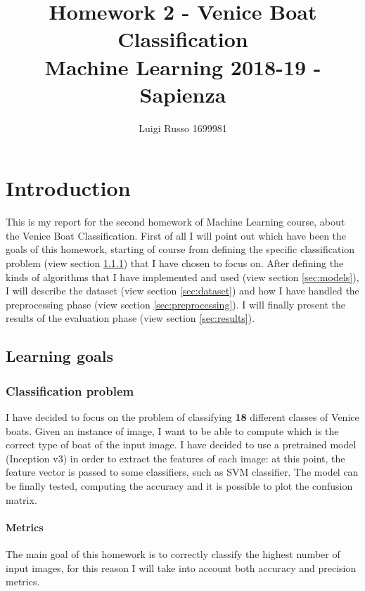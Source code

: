 \documentclass[12pt]{article}
\title{Homework 2 - Venice Boat Classification\\
	\large Machine Learning 2018-19 - Sapienza}
\author{Luigi Russo 1699981}
\begin{document}
	
\maketitle
\newpage
\tableofcontents
\newpage
\section{Introduction}
This is my report for the second homework of Machine Learning course, about the Venice Boat Classification. First of all I will point out which have been the goals of this homework, starting of course from defining the specific classification problem (view section \ref{sec:image_classification_problem}) that I have chosen to focus on. After defining the kinds of algorithms that I have implemented and used (view section \ref{sec:models}), I will describe the dataset (view section \ref{sec:dataset}) and how I have handled the preprocessing phase (view section \ref{sec:preprocessing}). I will finally present the results of the evaluation phase (view section \ref{sec:results}).

\subsection{Learning goals}
\subsubsection{Classification problem}
\label{sec:image_classification_problem}
I have decided to focus on the problem of classifying \textbf{18} different classes of Venice boats. Given an instance of image, I want to be able to compute which is the correct type of boat of the input image. I have decided to use a pretrained model (Inception v3) in order to extract the features of each image: at this point, the feature vector is passed to some classifiers, such as SVM classifier. The model can be finally tested, computing the accuracy and it is possible to plot the confusion matrix.
\paragraph*{Metrics}
The main goal of this homework is to correctly classify the highest number of input images, for this reason I will take into account both accuracy and precision metrics.
\end{document}
